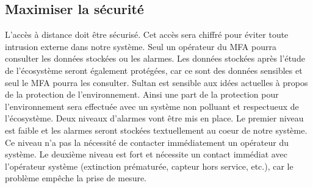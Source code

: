 

\subsection{Maximiser la sécurité}
\label{s:beo_obj_optisecu}

L’accès à distance doit être sécurisé.
Cet accès sera chiffré pour éviter toute intrusion externe dans notre système.
Seul un opérateur du MFA pourra consulter les données stockées ou les alarmes.
Les données stockées après l’étude de l’écosystème seront également protégées, car ce sont des données sensibles et seul le MFA pourra les consulter.
\wl
Sultan est sensible aux idées actuelles à propos de la protection de l’environnement.
Ainsi une part de la protection pour l’environnement sera effectuée avec un système non polluant et respectueux de l’écosystème.
\wl
Deux niveaux d’alarmes vont être mis en place.
Le premier niveau est faible et les alarmes seront stockées textuellement au coeur de notre système.
Ce niveau n’a pas la nécessité de contacter immédiatement un opérateur du système.
Le deuxième niveau est fort et nécessite un contact immédiat avec l’opérateur système (extinction prématurée, capteur hors service, etc.), car le problème empêche la prise de mesure.
